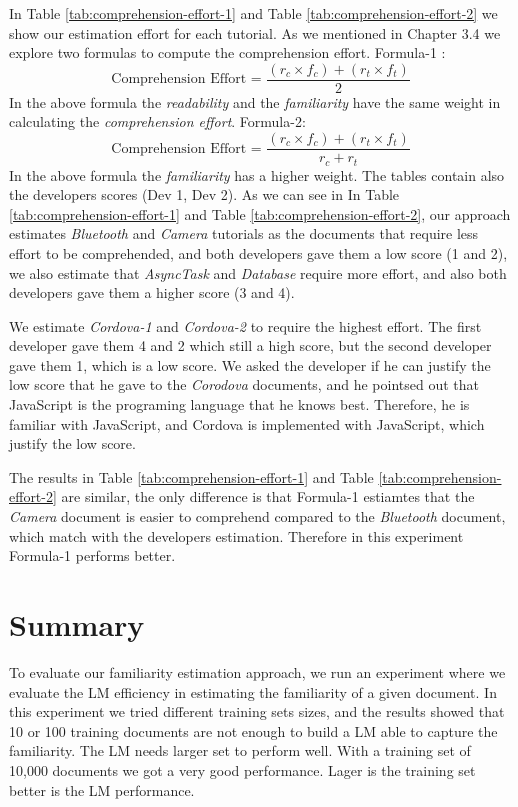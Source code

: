 \documentclass[12pt,mscthesis]{usiinfthesis}
\begin{document}
{In Table \ref{tab:comprehension-effort-1} and Table \ref{tab:comprehension-effort-2} we show our estimation effort for each tutorial. As we mentioned in Chapter 3.4 we explore two formulas to compute the comprehension effort. Formula-1 :
\[\text{Comprehension Effort = }\frac{(r_{c}\times f_{c}) + (r_{t} \times f_{t})}{2} \]
 In the above formula the \emph{readability} and the \emph{familiarity} have the same weight in calculating the \emph{comprehension effort}. Formula-2:
 \[\text{Comprehension Effort = }\frac{(r_{c}\times f_{c}) + (r_{t} \times f_{t})}{r_c+r_t} \]
 In the above formula the \emph{familiarity} has a higher weight. The tables contain also the developers scores (Dev 1, Dev 2). As we can see in In Table \ref{tab:comprehension-effort-1} and Table \ref{tab:comprehension-effort-2}, our approach estimates \emph{Bluetooth} and \emph{Camera} tutorials as the documents that require less effort to be comprehended, and both developers gave them a low score (1 and 2), we also estimate that \emph{AsyncTask} and \emph{Database} require more effort, and also both developers gave them a higher score (3 and 4).

We estimate \emph{Cordova-1} and \emph{Cordova-2} to require the highest effort. The first developer gave them 4 and 2 which still a high score, but the second developer gave them 1, which is a low score. We asked the developer if he can justify the low score that he gave to the \emph{Corodova} documents, and he pointsed out that JavaScript is the programing language that he knows best. Therefore, he is familiar with JavaScript, and Cordova is implemented with JavaScript, which justify the low score.

The results in Table \ref{tab:comprehension-effort-1} and Table \ref{tab:comprehension-effort-2} are similar, the only difference is that Formula-1 estiamtes that the \emph{Camera} document is easier to comprehend compared to the \emph{Bluetooth} document, which match with the developers estimation. Therefore in this experiment Formula-1 performs better. 



\section{Summary}
To evaluate our familiarity estimation approach, we run an experiment where we evaluate the LM efficiency in estimating the familiarity of a given document. In this experiment we tried different training sets sizes, and the results showed that 10 or 100 training documents are not enough to build a LM able to capture the familiarity. The LM needs larger set to perform well. With a training set of 10,000 documents we got a very good performance. Lager is the training set better is the LM performance.

}
\end{document}
